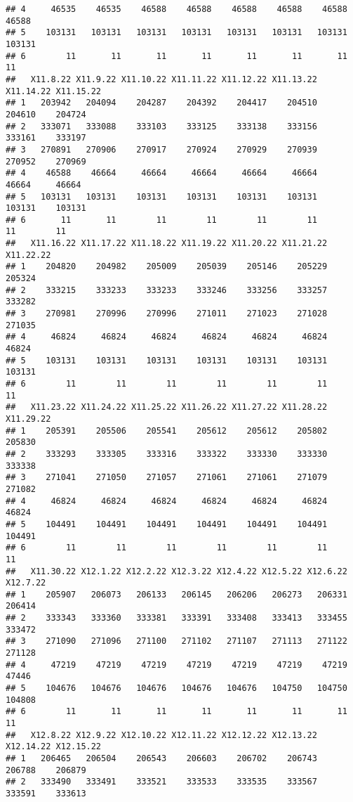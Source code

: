 \documentclass[
]{article}
\begin{document}
\begin{verbatim}
## 4     46535    46535    46588    46588    46588    46588    46588    46588
## 5    103131   103131   103131   103131   103131   103131   103131   103131
## 6        11       11       11       11       11       11       11       11
##   X11.8.22 X11.9.22 X11.10.22 X11.11.22 X11.12.22 X11.13.22 X11.14.22 X11.15.22
## 1   203942   204094    204287    204392    204417    204510    204610    204724
## 2   333071   333088    333103    333125    333138    333156    333161    333197
## 3   270891   270906    270917    270924    270929    270939    270952    270969
## 4    46588    46664     46664     46664     46664     46664     46664     46664
## 5   103131   103131    103131    103131    103131    103131    103131    103131
## 6       11       11        11        11        11        11        11        11
##   X11.16.22 X11.17.22 X11.18.22 X11.19.22 X11.20.22 X11.21.22 X11.22.22
## 1    204820    204982    205009    205039    205146    205229    205324
## 2    333215    333233    333233    333246    333256    333257    333282
## 3    270981    270996    270996    271011    271023    271028    271035
## 4     46824     46824     46824     46824     46824     46824     46824
## 5    103131    103131    103131    103131    103131    103131    103131
## 6        11        11        11        11        11        11        11
##   X11.23.22 X11.24.22 X11.25.22 X11.26.22 X11.27.22 X11.28.22 X11.29.22
## 1    205391    205506    205541    205612    205612    205802    205830
## 2    333293    333305    333316    333322    333330    333330    333338
## 3    271041    271050    271057    271061    271061    271079    271082
## 4     46824     46824     46824     46824     46824     46824     46824
## 5    104491    104491    104491    104491    104491    104491    104491
## 6        11        11        11        11        11        11        11
##   X11.30.22 X12.1.22 X12.2.22 X12.3.22 X12.4.22 X12.5.22 X12.6.22 X12.7.22
## 1    205907   206073   206133   206145   206206   206273   206331   206414
## 2    333343   333360   333381   333391   333408   333413   333455   333472
## 3    271090   271096   271100   271102   271107   271113   271122   271128
## 4     47219    47219    47219    47219    47219    47219    47219    47446
## 5    104676   104676   104676   104676   104676   104750   104750   104808
## 6        11       11       11       11       11       11       11       11
##   X12.8.22 X12.9.22 X12.10.22 X12.11.22 X12.12.22 X12.13.22 X12.14.22 X12.15.22
## 1   206465   206504    206543    206603    206702    206743    206788    206879
## 2   333490   333491    333521    333533    333535    333567    333591    333613

\end{verbatim}
\end{document}
